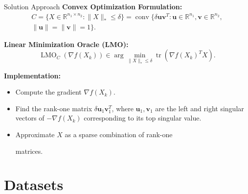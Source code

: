 \documentclass[12pt]{beamer}
\begin{document}
\begin{frame}{Solution Approach}
    \textbf{Convex Optimization Formulation:}
    \begin{equation*}
        \begin{aligned}
            C = \{X \in \mathbb{R}^{n_1 \times n_2} : \|X\|_* \leq \delta \} = \operatorname{conv}\{\delta \mathbf{u}\mathbf{v}^T : \mathbf{u} \in \mathbb{R}^{n_1}, \mathbf{v} \in \mathbb{R}^{n_2}, \\
            \|\mathbf{u}\| = \|\mathbf{v}\| = 1 \}.
        \end{aligned}
    \end{equation*}
    \vspace{-0.5cm}

    \textbf{Linear Minimization Oracle (LMO):}
    \begin{equation*}
        \operatorname{LMO}_C(\nabla f(X_k)) \in \arg\min_{\|X\|_* \leq \delta} \operatorname{tr}(\nabla f(X_k)^T X).
    \end{equation*}
    \vspace{-0.5cm}

    \textbf{Implementation:}
    \begin{itemize}
        \item Compute the gradient $\nabla f(X_k)$.
        \item Find the rank-one matrix $\delta\mathbf{u}_1\mathbf{v}_1^T$, where $\mathbf{u}_1, \mathbf{v}_1$ are the left and right singular vectors of $-\nabla f(X_k)$ corresponding to its top singular value.
        \item Approximate $X$ as a sparse combination of rank-one 
        
        matrices.
    \end{itemize}
\end{frame}


\section{Datasets}
\end{document}

